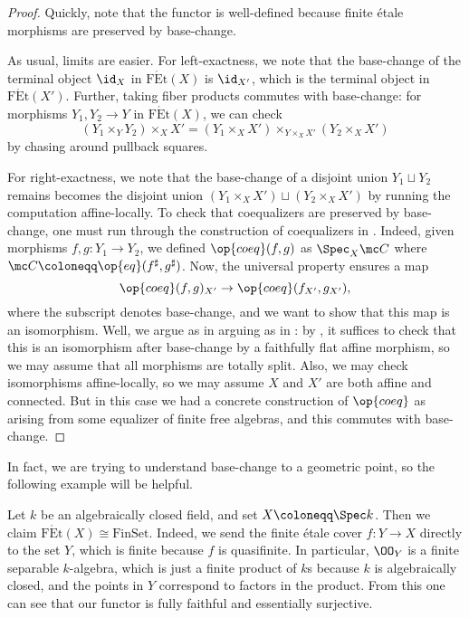 \documentclass{amsart}
\begin{document}
\begin{proof}
    Quickly, note that the functor is well-defined because finite \'etale morphisms are preserved by base-change.

    As usual, limits are easier. For left-exactness, we note that the base-change of the terminal object $\id_X$ in $\mathrm{F\acute Et}(X)$ is $\id_{X'}$, which is the terminal object in $\mathrm{F\acute Et}(X')$. Further, taking fiber products commutes with base-change: for morphisms $Y_1,Y_2\to Y$ in $\mathrm{F\acute Et}(X)$, we can check
    \[(Y_1\times_YY_2)\times_XX'=(Y_1\times_XX')\times_{Y\times_XX'}(Y_2\times_XX')\]
    by chasing around pullback squares.

    For right-exactness, we note that the base-change of a disjoint union $Y_1\sqcup Y_2$ remains becomes the disjoint union $(Y_1\times_XX')\sqcup(Y_2\times_XX')$ by running the computation affine-locally. To check that coequalizers are preserved by base-change, one must run through the construction of coequalizers in . Indeed, given morphisms $f,g\colon Y_1\to Y_2$, we defined $\op{coeq}(f,g)$ as $\Spec_X\mc C$ where $\mc C\coloneqq\op{eq}(f^\sharp,g^\sharp)$. Now, the universal property ensures a map
    \[\op{coeq}(f,g)_{X'}\to\op{coeq}(f_{X'},g_{X'}),\]
    where the subscript denotes base-change, and we want to show that this map is an isomorphism. Well, we argue as in arguing as in : by , it suffices to check that this is an isomorphism after base-change by a faithfully flat affine morphism, so we may assume that all morphisms are totally split. Also, we may check isomorphisms affine-locally, so we may assume $X$ and $X'$ are both affine and connected. But in this case we had a concrete construction of $\op{coeq}$ as arising from some equalizer of finite free algebras, and this commutes with base-change.
\end{proof}
In fact, we are trying to understand base-change to a geometric point, so the following example will be helpful.
\begin{example} \label{ex:pi-k-alg-closed}
    Let $k$ be an algebraically closed field, and set $X\coloneqq\Spec k$. Then we claim $\mathrm{F\acute Et}(X)\cong\mathrm{FinSet}$. Indeed, we send the finite \'etale cover $f\colon Y\to X$ directly to the set $Y$, which is finite because $f$ is quasifinite. In particular, $\OO_Y$ is a finite separable $k$-algebra, which is just a finite product of $k$s because $k$ is algebraically closed, and the points in $Y$ correspond to factors in the product. From this one can see that our functor is fully faithful and essentially surjective.
\end{example}
\end{document}
